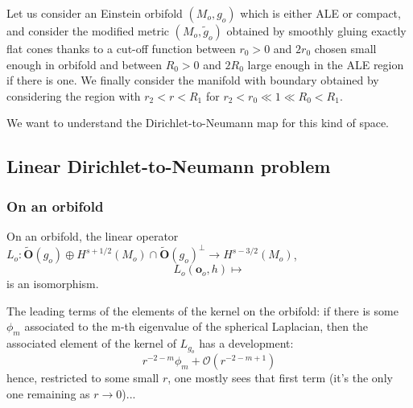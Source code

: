 \documentclass[12pt]{article}
\begin{document}
    Let us consider an Einstein orbifold $(M_o,g_o)$ which is either ALE or compact, and consider the modified metric $(M_o,\tilde{g}_o)$ obtained by smoothly gluing exactly flat cones thanks to a cut-off function between $r_0>0$ and $2r_0$ chosen small enough in orbifold and between $R_0>0$ and $2R_0$ large enough in the ALE region if there is one. We finally consider the manifold with boundary obtained by considering the region with $r_2<r<R_1$ for $r_2<r_0\ll 1 \ll R_0< R_1$.
    
    We want to understand the Dirichlet-to-Neumann map for this kind of space.
    
    \subsection{Linear Dirichlet-to-Neumann problem}
    
    
    
    
    
    \subsubsection{On an orbifold}
    
    On an orbifold, the linear operator $L_o:\tilde{\mathbf{O}}(g_o)\oplus H^{s+1/2}(M_o)\cap \tilde{\mathbf{O}}(g_o)^\perp\to H^{s-3/2}(M_o)$,
    $$ L_o(\mathbf{o}_o,h)\mapsto  $$
    is an isomorphism. 
    
    
    The leading terms of the elements of the kernel on the orbifold: if there is some $\phi_m$ associated to the m-th eigenvalue of the spherical Laplacian, then the associated element of the kernel of $L_{g_o}$ has a development:
    $$ r^{-2-m}\phi_m + \mathcal{O}(r^{-2-m+1}) $$
    hence, restricted to some small $r$, one mostly sees that first term (it's the only one remaining as $r\to 0$)...
    
\end{document}
